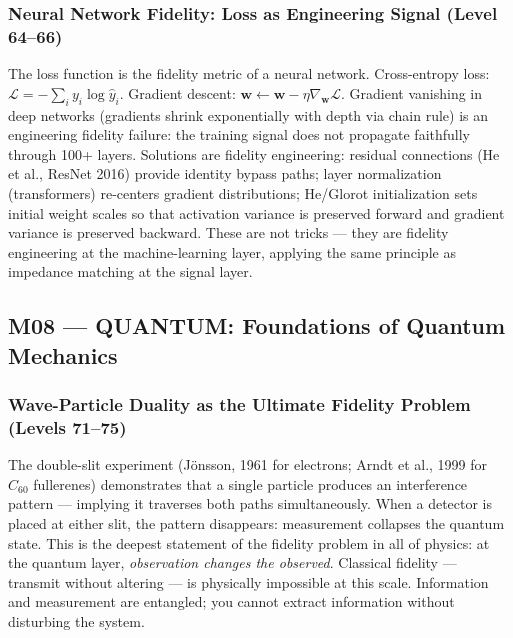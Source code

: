 \documentclass[11pt,letterpaper]{article}
\begin{document}
\subsubsection{Neural Network Fidelity: Loss as Engineering Signal (Level 64--66)}

The loss function is the fidelity metric of a neural network. Cross-entropy loss:
$\mathcal{L} = -\sum_i y_i \log \hat{y}_i$. Gradient descent: $\mathbf{w} \leftarrow \mathbf{w}
- \eta \nabla_\mathbf{w}\mathcal{L}$. Gradient vanishing in deep networks (gradients shrink
exponentially with depth via chain rule) is an engineering fidelity failure: the training signal
does not propagate faithfully through 100+ layers. Solutions are fidelity engineering: residual
connections (He et al., ResNet 2016) provide identity bypass paths; layer normalization
(transformers) re-centers gradient distributions; He/Glorot initialization sets initial weight
scales so that activation variance is preserved forward and gradient variance is preserved
backward. These are not tricks --- they are fidelity engineering at the machine-learning layer,
applying the same principle as impedance matching at the signal layer.

\subsection{M08 --- QUANTUM: Foundations of Quantum Mechanics}

\subsubsection{Wave-Particle Duality as the Ultimate Fidelity Problem (Levels 71--75)}

The double-slit experiment (Jönsson, 1961 for electrons; Arndt et al., 1999 for $C_{60}$
fullerenes) demonstrates that a single particle produces an interference pattern --- implying
it traverses both paths simultaneously. When a detector is placed at either slit, the pattern
disappears: measurement collapses the quantum state. This is the deepest statement of the
fidelity problem in all of physics: at the quantum layer, \textit{observation changes the
observed}. Classical fidelity --- transmit without altering --- is physically impossible at
this scale. Information and measurement are entangled; you cannot extract information without
disturbing the system.
\end{document}
